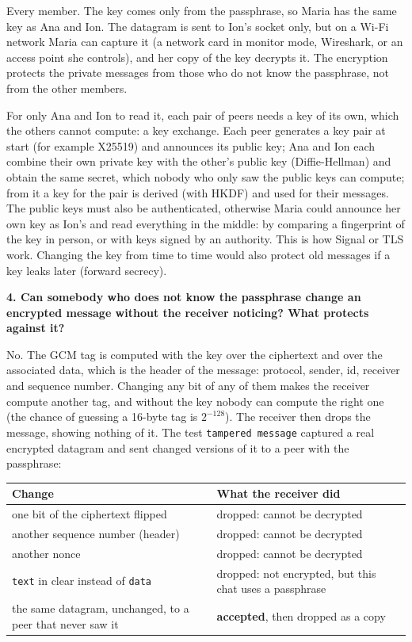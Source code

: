 \documentclass[11pt,a4paper]{article}
\newcommand{\question}[1]{\par\medskip\textbf{#1}\par}
\newcommand{\code}[1]{{\frenchspacing\texttt{#1}}}
\begin{document}
Every member. The key comes only from the passphrase, so Maria has the same key as Ana and Ion. The
datagram is sent to Ion's socket only, but on a Wi-Fi network Maria can capture it (a network
card in monitor mode, Wireshark, or an access point she controls), and her copy of the key decrypts
it. The encryption protects the private messages from those who do not know the passphrase, not from
the other members.

For only Ana and Ion to read it, each pair of peers needs a key of its own, which the others cannot
compute: a key exchange. Each peer generates a key pair at start (for example X25519) and announces
its public key; Ana and Ion each combine their own private key with the other's public key
(Diffie-Hellman) and obtain the same secret, which nobody who only saw the public keys can compute;
from it a key for the pair is derived (with HKDF) and used for their messages. The public keys must
also be authenticated, otherwise Maria could announce her own key as Ion's and read everything in
the middle: by comparing a fingerprint of the key in person, or with keys signed by an authority.
This is how Signal or TLS work. Changing the key from time to time would also protect old messages
if a key leaks later (forward secrecy).

\question{4. Can somebody who does not know the passphrase change an encrypted message without the
receiver noticing? What protects against it?}

No. The GCM tag is computed with the key over the ciphertext and over the associated data, which is
the header of the message: protocol, sender, id, receiver and sequence number. Changing any bit of
any of them makes the receiver compute another tag, and without the key nobody can compute the right
one (the chance of guessing a 16-byte tag is $2^{-128}$). The receiver then drops the message,
showing nothing of it. The test \code{tampered message} captured a real encrypted datagram and sent
changed versions of it to a peer with the passphrase:

\begin{center}
\small
\begin{tabularx}{\linewidth}{@{}lX@{}}
\toprule
Change & What the receiver did \\
\midrule
one bit of the ciphertext flipped & dropped: cannot be decrypted \\
another sequence number (header) & dropped: cannot be decrypted \\
another nonce & dropped: cannot be decrypted \\
\code{text} in clear instead of \code{data} & dropped: not encrypted, but this chat uses a passphrase \\
the same datagram, unchanged, to a peer that never saw it & \textbf{accepted}, then dropped as a copy \\
\bottomrule
\end{tabularx}
\end{center}
\end{document}
